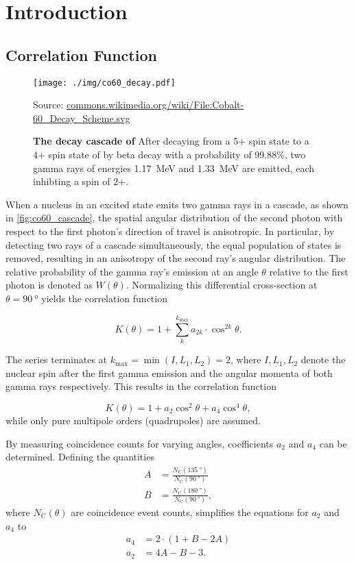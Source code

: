 \chapter{Introduction}

\section{Correlation Function}
\begin{figure}[tbp]
	\centering
	\texttt{[image: ./img/co60\_decay.pdf]}
	\caption*{Source: \url{commons.wikimedia.org/wiki/File:Cobalt-60_Decay_Scheme.svg}}
	\caption[The decay cascade of ]{\textbf{The decay cascade of } After decaying from a 5+ spin state to a 4+ spin state of  by beta decay with a probability of \num{99.88}\%, two gamma rays of energies \SI{1.17}{\MeV} and \SI{1.33}{\MeV} are emitted, each inhibting a spin of 2+.}
	\label{fig:co60_cascade}
\end{figure}
When a nucleus in an excited state emits two gamma rays in a cascade, as shown in \autoref{fig:co60_cascade}, the spatial angular distribution of the second photon with respect to the first photon's direction of travel is anisotropic.
In particular, by detecting two rays of a cascade simultaneously, the equal population of states is removed, resulting in an anisotropy of the second ray's angular distribution.
The relative probability of the gamma ray's emission at an angle $\theta$ relative to the first photon is denoted as $W(\theta)$.
Normalizing this differential cross-section at $\theta=\SI{90}{\degree}$ yields the correlation function

\begin{equation*}
	K(\theta) = 1 + \sum_{k}^{k_\text{max}}a_{2k}\cdot\cos^{2k}{\theta}.
\end{equation*}

The series terminates at $k_\text{max}=\min(I, L_1, L_2)=2$, where $I, L_1, L_2$ denote the nuclear spin after the first gamma emission and the angular momenta of both gamma rays respectively.
This results in the correlation function

\begin{equation}\label{eq:corr_func}
	K(\theta) = 1 + a_2\cos^{2}{\theta} + a_4\cos^{4}{\theta},
\end{equation}
while only pure multipole orders (quadrupoles) are assumed.

By measuring coincidence counts for varying angles, coefficients $a_2$ and $a_4$ can be determined.
Defining the quantities
\begin{align}
	A&=\frac{N_\text{C}(\SI{135}{\degree})}{N_\text{C}(\SI{90}{\degree})} \label{eq:A}\\
	B&=\frac{N_\text{C}(\SI{180}{\degree})}{N_\text{C}(\SI{90}{\degree})}, \label{eq:B}
\end{align}
where $N_\text{C}(\theta)$ are coincidence event counts, simplifies the equations for $a_2$ and $a_4$ to
\begin{align}
	a_4 &= 2\cdot(1+B-2A) \label{eq:a4}\\
	a_2 &= 4A-B-3. \label{eq:a2}
\end{align}

